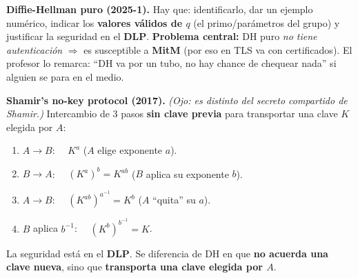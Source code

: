 \documentclass[../main.tex]{subfiles}
\begin{document}
\begin{examen}
\textbf{Diffie-Hellman puro (2025-1).} Hay que: identificarlo, dar un ejemplo
numérico, indicar los \textbf{valores válidos de $q$} (el primo/parámetros del grupo)
y justificar la seguridad en el \textbf{DLP}. \textbf{Problema central:} DH puro
\emph{no tiene autenticación} $\Rightarrow$ es susceptible a \textbf{MitM} (por eso en
TLS va con certificados). El profesor lo remarca: ``DH va por un tubo, no hay chance
de chequear nada'' si alguien se para en el medio.
\end{examen}

\begin{examen}
\textbf{Shamir's no-key protocol (2017).} \emph{(Ojo: es distinto del secreto
compartido de Shamir.)} Intercambio de 3 pasos \textbf{sin clave previa} para
transportar una clave $K$ elegida por $A$:
\begin{enumerate}[leftmargin=1.5em]
  \item $A \to B$: $\quad K^a$ \quad ($A$ elige exponente $a$).
  \item $B \to A$: $\quad (K^a)^b = K^{ab}$ \quad ($B$ aplica su exponente $b$).
  \item $A \to B$: $\quad (K^{ab})^{a^{-1}} = K^{b}$ \quad ($A$ ``quita'' su $a$).
  \item $B$ aplica $b^{-1}$: $\quad (K^{b})^{b^{-1}} = K$.
\end{enumerate}
La seguridad está en el \textbf{DLP}. Se diferencia de DH en que \textbf{no acuerda
una clave nueva}, sino que \textbf{transporta una clave elegida por $A$}.

\begin{center}
\end{center}
\end{examen}
\end{document}

